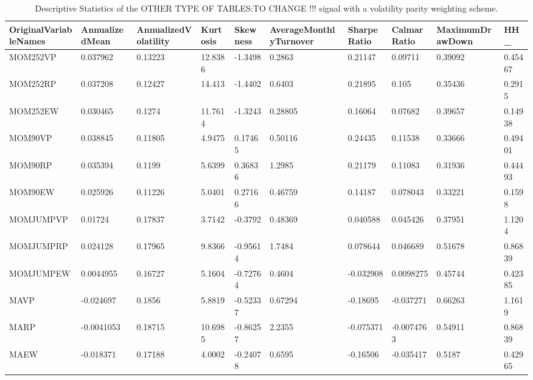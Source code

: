 \begin{table}[H]
\centering
\begin{tabular}{llllllllll}
OriginalVariableNames & AnnualizedMean & AnnualizedVolatility & Kurtosis & Skewness & AverageMonthlyTurnover & SharpeRatio & CalmarRatio & MaximumDrawDown & HH_ \\ 
\hline 
MOM252VP & 0.037962 & 0.13223 & 12.8386 & -1.3498 & 0.2863 & 0.21147 & 0.09711 & 0.39092 & 0.45467 \\ 
MOM252RP & 0.037208 & 0.12427 & 14.413 & -1.4402 & 0.6403 & 0.21895 & 0.105 & 0.35436 & 0.2915 \\ 
MOM252EW & 0.030465 & 0.1274 & 11.7614 & -1.3243 & 0.28805 & 0.16064 & 0.07682 & 0.39657 & 0.14938 \\ 
MOM90VP & 0.038845 & 0.11805 & 4.9475 & 0.17465 & 0.50116 & 0.24435 & 0.11538 & 0.33666 & 0.49401 \\ 
MOM90RP & 0.035394 & 0.1199 & 5.6399 & 0.36836 & 1.2985 & 0.21179 & 0.11083 & 0.31936 & 0.44493 \\ 
MOM90EW & 0.025926 & 0.11226 & 5.0401 & 0.27166 & 0.46759 & 0.14187 & 0.078043 & 0.33221 & 0.1598 \\ 
MOMJUMPVP & 0.01724 & 0.17837 & 3.7142 & -0.3792 & 0.48369 & 0.040588 & 0.045426 & 0.37951 & 1.1204 \\ 
MOMJUMPRP & 0.024128 & 0.17965 & 9.8366 & -0.95614 & 1.7484 & 0.078644 & 0.046689 & 0.51678 & 0.86839 \\ 
MOMJUMPEW & 0.0044955 & 0.16727 & 5.1604 & -0.72764 & 0.4604 & -0.032908 & 0.0098275 & 0.45744 & 0.42385 \\ 
MAVP & -0.024697 & 0.1856 & 5.8819 & -0.52337 & 0.67294 & -0.18695 & -0.037271 & 0.66263 & 1.1619 \\ 
MARP & -0.0041053 & 0.18715 & 10.6985 & -0.86257 & 2.2355 & -0.075371 & -0.0074763 & 0.54911 & 0.86839 \\ 
MAEW & -0.018371 & 0.17188 & 4.0002 & -0.24078 & 0.6595 & -0.16506 & -0.035417 & 0.5187 & 0.42965 \\ 
\hline
\end{tabular}
\caption{Descriptive Statistics of the OTHER TYPE OF TABLES:TO CHANGE !!!  signal with a volatility parity weighting scheme.}
\label{model1}
\end{table}
